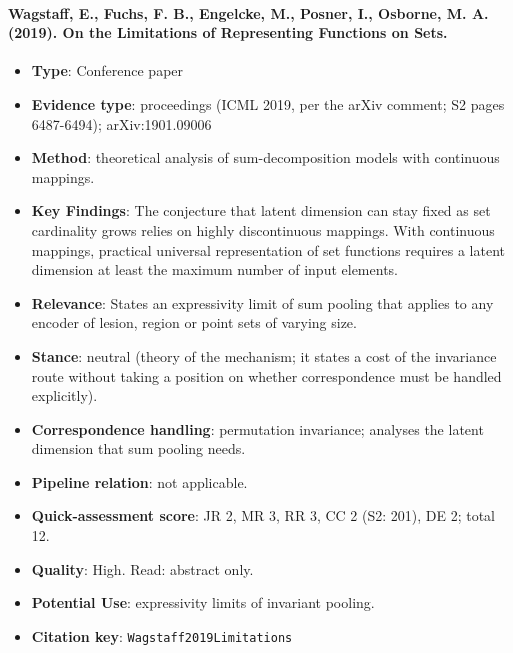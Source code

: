 \documentclass[journal,onecolumn]{IEEEtran}
\begin{document}
\paragraph{Wagstaff, E., Fuchs, F. B., Engelcke, M., Posner, I., Osborne, M. A. (2019). On the Limitations of Representing Functions on Sets.~\cite{Wagstaff2019Limitations}}\mbox{}

\begin{itemize}

\item{} \textbf{Type}: Conference paper

\item{} \textbf{Evidence type}: proceedings (ICML 2019, per the arXiv comment; S2 pages 6487-6494); arXiv:1901.09006

\item{} \textbf{Method}: theoretical analysis of sum-decomposition models with continuous mappings.

\item{} \textbf{Key Findings}: The conjecture that latent dimension can stay fixed as set cardinality grows relies on highly discontinuous mappings. With continuous mappings, practical universal representation of set functions requires a latent dimension at least the maximum number of input elements.

\item{} \textbf{Relevance}: States an expressivity limit of sum pooling that applies to any encoder of lesion, region or point sets of varying size.

\item{} \textbf{Stance}: neutral (theory of the mechanism; it states a cost of the invariance route without taking a position on whether correspondence must be handled explicitly).

\item{} \textbf{Correspondence handling}: permutation invariance; analyses the latent dimension that sum pooling needs.

\item{} \textbf{Pipeline relation}: not applicable.

\item{} \textbf{Quick-assessment score}: JR 2, MR 3, RR 3, CC 2 (S2: 201), DE 2; total 12.

\item{} \textbf{Quality}: High. Read: abstract only.

\item{} \textbf{Potential Use}: expressivity limits of invariant pooling.

\item{} \textbf{Citation key}: \texttt{Wagstaff2019Limitations}

\end{itemize}
\end{document}

